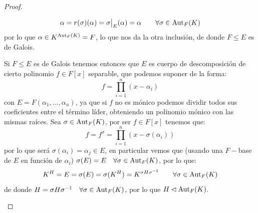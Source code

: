 \begin{teo}
\begin{proof}
\begin{description}
\begin{equation*}
                    \alpha = r(\sigma)(\alpha) = \sigma\big|_E(\alpha) = \alpha \qquad \forall \sigma\in \operatorname{Aut}_F(K)
                \end{equation*}
                por lo que $\alpha \in K^{\operatorname{Aut}_F(K)} = F$, lo que nos da la otra inclusión, de donde $F\leq E$ es de Galois.
            \item [$\Longleftarrow )$] Si $F\leq E$ es de Galois tenemos entonces que $E$ es cuerpo de descomposición de cierto polinomio $f\in F[x]$ separable, que podemos suponer de la forma:
                \begin{equation*}
                    f = \prod_{i=1}^{n}(x-\alpha_i)
                \end{equation*}
                con $E = F(\alpha_1,\ldots,\alpha_n)$, ya que si $f$ no es mónico podemos dividir todos sus coeficientes entre el término líder, obteniendo un polinomio mónico con las mismas raíces. Sea $\sigma\in \operatorname{Aut}_F(K)$, por ser $f\in F[x]$ tenemos que:
                \begin{equation*}
                    f = f^{\sigma} = \prod_{i=1}^{n}(x-\sigma(\alpha_i))
                \end{equation*}
                por lo que será $\sigma(\alpha_i)=\alpha_j\in E$, en particular vemos que (usando una $F-$base de $E$ en función de $\alpha_i$) $\sigma(E) = E\quad \forall \sigma\in \operatorname{Aut}_F(K)$, por lo que:
                \begin{equation*}
                    K^H = E = \sigma(E) = \sigma(K^H) = K^{\sigma H\sigma^{-1}} \qquad \forall \sigma\in \operatorname{Aut}_F(K)
                \end{equation*}
                de donde $H =\sigma H \sigma^{-1}\quad \forall \sigma\in \operatorname{Aut}_F(K)$, por lo que $H\lhd \operatorname{Aut}_F(K)$.\qedhere
        \end{description}
    \end{proof}
\end{teo}

